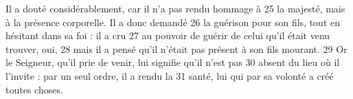 Il a douté considérablement, car il n'a pas rendu hommage à	 
25	 	la majesté, mais à la présence corporelle. Il a donc demandé	 
26	 	la guérison pour son fils, tout en hésitant dans sa foi : il a cru	 
27	 	au pouvoir de guérir de celui qu'il était venu trouver, oui,	 
28	 	mais il a pensé qu'il n'était pas présent à son fils mourant.	 
29	 	Or le Seigneur, qu'il prie de venir, lui signifie qu'il n'est pas	 
30	 	absent du lieu où il l'invite : par un seul ordre, il a rendu la	 
31	 	santé, lui qui par sa volonté a créé toutes choses.